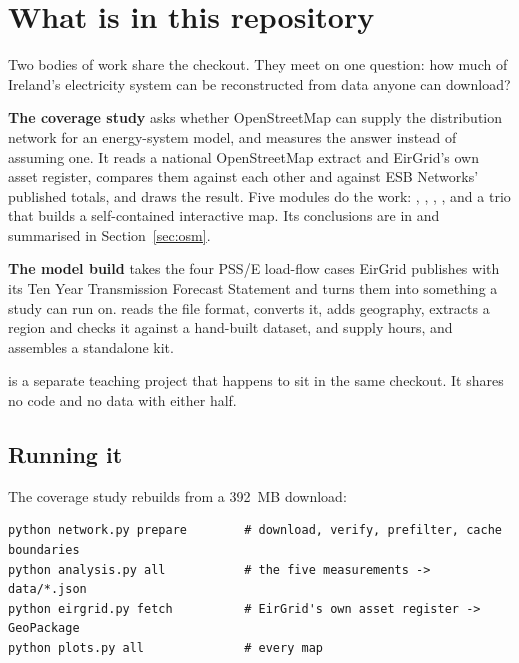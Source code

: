 \documentclass[11pt,a4paper]{article}
\begin{document}
\clearpage
\tableofcontents
\clearpage

\section{What is in this repository}

Two bodies of work share the checkout. They meet on one question: how much of
Ireland's electricity system can be reconstructed from data anyone can
download?

\textbf{The coverage study} asks whether OpenStreetMap can supply the
distribution network for an energy-system model, and measures the answer
instead of assuming one. It reads a national OpenStreetMap extract and
EirGrid's own asset register, compares them against each other and against
ESB Networks' published totals, and draws the result. Five modules do the
work: , , ,
, and a trio that builds a self-contained interactive map.
Its conclusions are in  and summarised in
Section~\ref{sec:osm}.

\textbf{The model build} takes the four PSS/E load-flow cases EirGrid
publishes with its Ten Year Transmission Forecast Statement and turns them
into something a study can run on.  reads the file format,
 converts it,  adds geography,
 extracts a region and checks it against a hand-built
dataset,  and  supply hours, and
 assembles a standalone kit.

 is a separate teaching project that happens to sit in
the same checkout. It shares no code and no data with either half.

\subsection{Running it}

The coverage study rebuilds from a 392~MB download:

\begin{lstlisting}[language=shell]
python network.py prepare        # download, verify, prefilter, cache boundaries
python analysis.py all           # the five measurements -> data/*.json
python eirgrid.py fetch          # EirGrid's own asset register -> GeoPackage
python plots.py all              # every map
\end{lstlisting}
\end{document}
